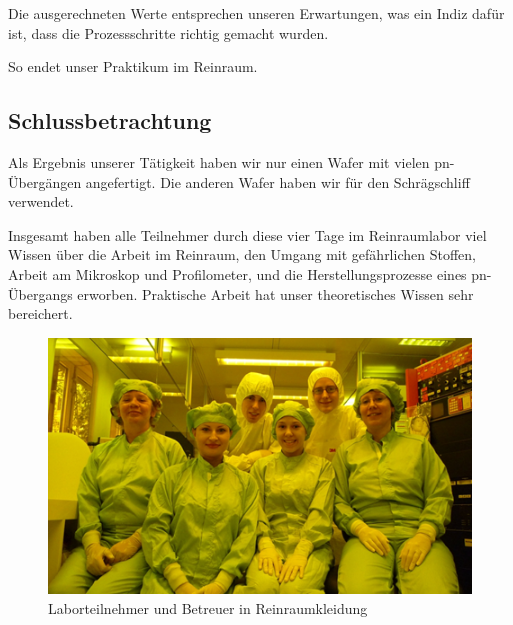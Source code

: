 Die ausgerechneten Werte entsprechen unseren Erwartungen, was ein Indiz dafür ist, dass die Prozessschritte richtig gemacht wurden.

So endet unser Praktikum im Reinraum.



\subsection[Schlussbetrachtung]{Schlussbetrachtung}

Als Ergebnis unserer Tätigkeit haben wir nur einen Wafer mit vielen pn-Übergängen angefertigt. Die anderen Wafer haben wir für den Schrägschliff verwendet.

Insgesamt haben alle Teilnehmer durch diese vier Tage im Reinraumlabor viel Wissen über die Arbeit im Reinraum, den Umgang mit gefährlichen Stoffen, Arbeit am Mikroskop und Profilometer, und die Herstellungsprozesse eines pn-Übergangs erworben.
Praktische Arbeit hat unser theoretisches Wissen sehr bereichert.


\begin{figure}[H]
    \centering
        \includegraphics[width=1\textwidth]{bilder/Endbild.png}
    \caption{Laborteilnehmer und Betreuer in Reinraumkleidung}
    \label{fig:Endbild}
\end{figure}



\newpage

